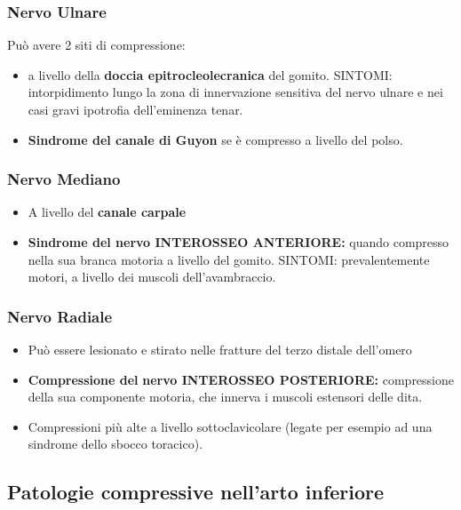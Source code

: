 \subsubsection{Nervo Ulnare}

Può avere 2 siti di compressione:

\begin{itemize}
\item
  a livello della \textbf{doccia epitrocleolecranica} del gomito. SINTOMI: intorpidimento lungo la zona di innervazione sensitiva del nervo ulnare e nei casi gravi ipotrofia dell'eminenza tenar.
\item
  \textbf{Sindrome del canale di Guyon} se è compresso a livello del polso.
\end{itemize}

\subsubsection{Nervo Mediano}

\begin{itemize}
\item
  A livello del \textbf{canale carpale}
\item
  \textbf{Sindrome del nervo INTEROSSEO ANTERIORE:} quando compresso nella sua branca motoria a livello del gomito.
SINTOMI: prevalentemente motori, a livello dei muscoli dell'avambraccio.
\end{itemize}

\subsubsection{Nervo Radiale}

\begin{itemize}
\item
  Può essere lesionato e stirato nelle fratture del terzo distale dell'omero
\item
  \textbf{Compressione del} \textbf{nervo INTEROSSEO POSTERIORE:} compressione della sua componente motoria, che innerva i muscoli estensori delle dita.
\item
  Compressioni più alte a livello sottoclavicolare (legate per esempio ad una sindrome dello sbocco toracico).
\end{itemize}

\subsection{Patologie compressive nell'arto inferiore}

